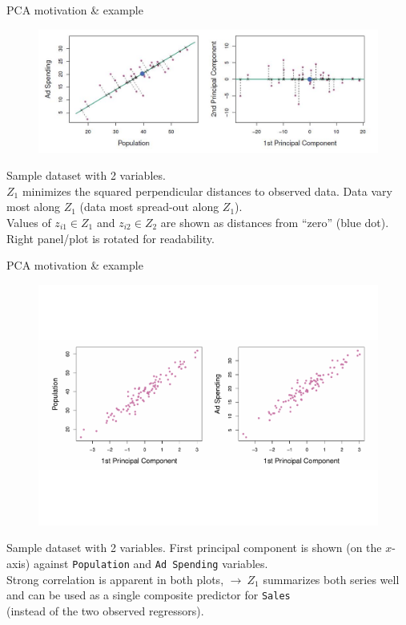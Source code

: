\documentclass{beamer}
\begin{document}
\begin{frame}{PCA motivation \& example}
\vspace{-1.0cm}
\begin{figure}
\includegraphics[scale=0.42]{IMG/PCAexample2.jpg}
\end{figure}
\vspace{-0.1cm}
\centering Sample dataset with 2 variables.  \\$Z_1$ minimizes the squared perpendicular distances to observed data. Data vary most along $Z_1$ (data most spread-out along $Z_1$). \\Values of $z_{i1} \in Z_1$ and $z_{i2} \in Z_2$ are shown as distances from ``zero'' (blue dot). Right panel/plot is rotated for readability.
\end{frame}
\begin{frame}{PCA motivation \& example}
\vspace{-2.2cm}
\begin{figure}
\includegraphics[scale=0.40]{IMG/PCAExample3.pdf}
\end{figure}
\vspace{-2cm}
\centering Sample dataset with 2 variables. First principal component is shown (on the $x$-axis) against \texttt{Population} and \texttt{Ad Spending} variables. \\Strong correlation is apparent in both plots, $ \rightarrow ~Z_1$ summarizes both series well and can be used as a single composite predictor for \texttt{Sales} \\(instead of the two observed regressors).
\end{frame}
\end{document}
